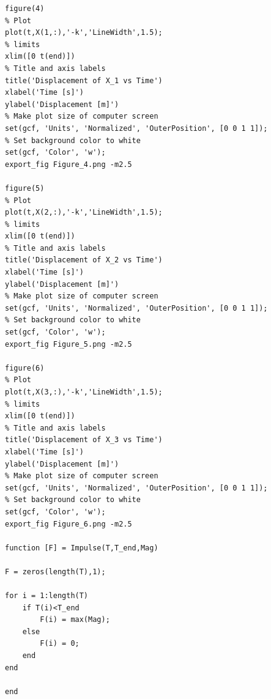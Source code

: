 \documentclass{article}
\begin{document}
\begin{lstlisting}[style=Matlab-editor]
figure(4)
% Plot
plot(t,X(1,:),'-k','LineWidth',1.5);
% limits
xlim([0 t(end)])
% Title and axis labels
title('Displacement of X_1 vs Time')
xlabel('Time [s]')
ylabel('Displacement [m]')
% Make plot size of computer screen
set(gcf, 'Units', 'Normalized', 'OuterPosition', [0 0 1 1]);
% Set background color to white
set(gcf, 'Color', 'w');
export_fig Figure_4.png -m2.5

figure(5)
% Plot
plot(t,X(2,:),'-k','LineWidth',1.5);
% limits
xlim([0 t(end)])
% Title and axis labels
title('Displacement of X_2 vs Time')
xlabel('Time [s]')
ylabel('Displacement [m]')
% Make plot size of computer screen
set(gcf, 'Units', 'Normalized', 'OuterPosition', [0 0 1 1]);
% Set background color to white
set(gcf, 'Color', 'w');
export_fig Figure_5.png -m2.5   

figure(6)
% Plot
plot(t,X(3,:),'-k','LineWidth',1.5);
% limits
xlim([0 t(end)])
% Title and axis labels
title('Displacement of X_3 vs Time')
xlabel('Time [s]')
ylabel('Displacement [m]')
% Make plot size of computer screen
set(gcf, 'Units', 'Normalized', 'OuterPosition', [0 0 1 1]);
% Set background color to white
set(gcf, 'Color', 'w');
export_fig Figure_6.png -m2.5

function [F] = Impulse(T,T_end,Mag)

F = zeros(length(T),1);

for i = 1:length(T)
    if T(i)<T_end
        F(i) = max(Mag);
    else
        F(i) = 0;
    end
end

end
\end{lstlisting}
\end{document}

